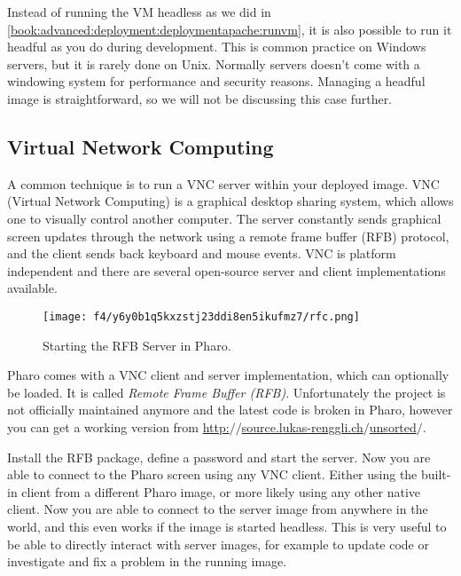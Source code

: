 \documentclass[a4paper,10pt,twoside]{book}
\begin{document}
Instead of running the  VM headless as we did in \autoref{book:advanced:deployment:deploymentapache:runvm}, it is also possible to run it headful as you do during development. This is common practice on Windows servers, but it is rarely done on Unix. Normally servers doesn't come with a windowing system for performance and security reasons. Managing a headful image is straightforward, so we will not be discussing this case further.

\subsection{Virtual Network Computing}
\label{book:advanced:deployment:maintaining:vnc}

A common technique is to run a VNC server within your deployed image. VNC (Virtual Network Computing) is a graphical desktop sharing system, which allows one to visually control another computer. The server constantly sends graphical screen updates through the network using a remote frame buffer (RFB) protocol, and the client sends back keyboard and mouse events. VNC is platform independent and there are several open-source server and client implementations available.

\begin{figure}[h!tbp]
	\begin{center}
		\texttt{[image: f4/y6y0b1q5kxzstj23ddi8en5ikufmz7/rfc.png]}
		\caption{Starting the RFB Server in Pharo.\label{book:advanced:deployment:maintaining:vnc:rfb}}
	\end{center}
\end{figure}


Pharo comes with a VNC client and server implementation, which can optionally be loaded. It is called \textit{Remote Frame Buffer (RFB)}. Unfortunately the project is not officially maintained anymore and the latest code is broken in Pharo, however you can get a working version from \href{http://source.lukas-renggli.ch/unsorted/}{http:$/$$/$source.lukas-renggli.ch$/$unsorted$/$}.

Install the RFB package, define a password and start the server. Now you are able to connect to the Pharo screen using any VNC client. Either using the built-in client from a different Pharo image, or more likely using any other native client. Now you are able to connect to the server image from anywhere in the world, and this even works if the image is started headless. This is very useful to be able to directly interact with server images, for example to update code or investigate and fix a problem in the running image.
\end{document}
